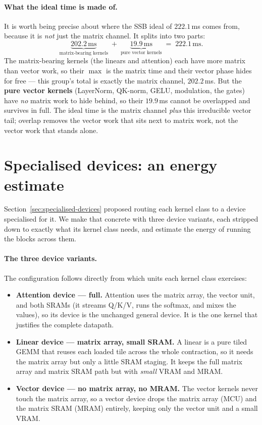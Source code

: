 \documentclass[11pt]{report}
\begin{document}
\paragraph{What the ideal time is made of.} It is worth being precise about
where the SSB ideal of $222.1$\,ms comes from, because it is \emph{not} just
the matrix channel. It splits into two parts:
\[
\underbrace{202.2\,\text{ms}}_{\text{matrix-bearing kernels}}
\;+\;
\underbrace{19.9\,\text{ms}}_{\text{pure vector kernels}}
\;=\; 222.1\,\text{ms}.
\]
The matrix-bearing kernels (the linears and attention) each have more matrix
than vector work, so their $\max$ is the matrix time and their vector phase
hides for free --- this group's total is exactly the matrix channel,
$202.2$\,ms. But the \textbf{pure vector kernels} (LayerNorm, QK-norm, GELU,
modulation, the gates) have \emph{no} matrix work to hide behind, so their
$19.9$\,ms cannot be overlapped and survives in full. The ideal time is the
matrix channel \emph{plus} this irreducible vector tail; overlap removes the
vector work that sits next to matrix work, not the vector work that stands
alone.

\section{Specialised devices: an energy estimate}
\label{sec:results-specialised}

Section~\ref{sec:specialised-devices} proposed routing each kernel class to a
device specialised for it. We make that concrete with three device variants,
each stripped down to exactly what its kernel class needs, and estimate the
energy of running the blocks across them.

\paragraph{The three device variants.} The configuration follows directly
from which units each kernel class exercises:

\begin{itemize}
\item \textbf{Attention device --- full.} Attention uses the matrix array,
the vector unit, and both SRAMs (it streams Q/K/V, runs the softmax, and
mixes the values), so its device is the unchanged general device. It is the
one kernel that justifies the complete datapath.
\item \textbf{Linear device --- matrix array, small SRAM.} A linear is a
pure tiled GEMM that reuses each loaded tile across the whole contraction, so
it needs the matrix array but only a little SRAM staging. It keeps the full
matrix array and matrix SRAM path but with \emph{small} VRAM and MRAM.
\item \textbf{Vector device --- no matrix array, no MRAM.} The vector
kernels never touch the matrix array, so a vector device drops the matrix
array (MCU) and the matrix SRAM (MRAM) entirely, keeping only the vector unit
and a small VRAM.
\end{itemize}
\end{document}
